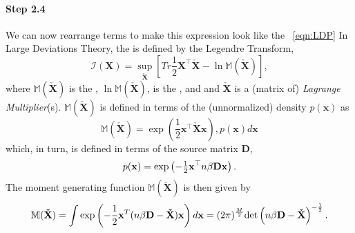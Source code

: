 \paragraph{Step 2.4}
We can now rearrange terms to make this expression look like the \EQN~\ref{eqn:LDP}
In Large Deviations Theory, the \RateFunction is defined by the Legendre Transform,
\begin{equation}
\label{eqn:rate-fun}
    \mathcal{I}(\mathbf{X})=\underset{\mathbf{\check{X}}}{\sup}
    \left[Tr\dfrac{1}{2}\mathbf{{X}}^{\top}\mathbf{\check{X}}-\ln\mathbb{M}(\mathbf{\check{X}})\right]  ,
\end{equation}
where $\mathbb{M}(\mathbf{\check{X}})$ is the \MomentGeneratingFunction,
$\ln\mathbb{M}(\mathbf{\check{X}})$, is the \CumulantGeneratingFunction, and
and $\mathbf{\check{X}}$ is a (matrix of) \emph{Lagrange Multiplier}(s).  $\mathbb{M}(\mathbf{\check{X}})$ is defined in terms of the (unnormalized) density $p(\mathbf{x})$ as
\begin{equation}
\label{eqn:rate_function}
   \mathbb{M}(\mathbf{\check{X}})=\exp\left(\frac{1}{2}\mathbf{x}^{\top}\mathbf{\check{X}}\mathbf{x}\right)  ,
  p(\mathbf{x})d\mathbf{x}
\end{equation}
which, in turn, is defined in terms of the source matrix $\mathbf{D}$,
\begin{equation}
\label{eqn:X_density}
p(\mathbf{x})=\exp\left(-\tfrac{1}{2}\mathbf{x}^{\top}n\beta\mathbf{D}\mathbf{x}\right)  .
\end{equation}
%
The moment generating function $ \mathbb{M}(\mathbf{\check{X}})$ is then given by
%
\begin{equation}
\mathbb{M}(\mathbf{\check{X}}) 
   = \int \exp\left(-\frac{1}{2}\mathbf{x}^T(n\beta\mathbf{D} - \mathbf{\check{X}})\mathbf{x}\right) d\mathbf{x} 
   = (2\pi)^{\frac{M}{2}} \mbox{}{\text{det}}\left(n\beta\mathbf{D} - \mathbf{\check{X}}\right)^{-\frac{1}{2}}  .
\end{equation}

